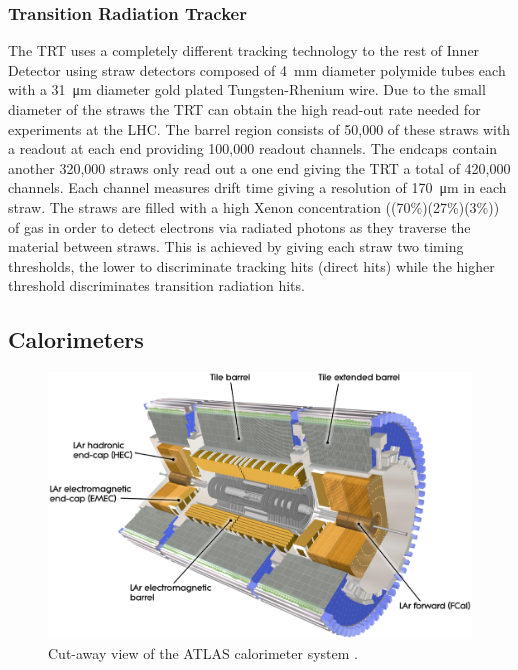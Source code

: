 		\subsubsection*{Transition Radiation Tracker}

		The TRT uses a completely different tracking technology to the rest of Inner Detector using straw detectors composed of 4~mm diameter polymide tubes each with a \SI{31}{\um} diameter gold plated Tungsten-Rhenium wire. Due to the small diameter of the straws the TRT can obtain the high read-out rate needed for experiments at the LHC. The barrel region consists of 50,000 of these straws with a readout at each end providing 100,000 readout channels. The endcaps contain another 320,000 straws only read out a one end giving the TRT a total of 420,000 channels. Each channel measures drift time giving a resolution of \SI{170}{\um} in each straw. The straws are filled with a high Xenon concentration ((70\%)(27\%)(3\%)) of gas in order to detect electrons via radiated photons as they traverse the material between straws. This is achieved by giving each straw two timing thresholds, the lower to discriminate tracking hits (direct hits) while the higher threshold discriminates transition radiation hits. \\ %
		



	\subsection{Calorimeters}

		\begin{figure}[h]
			\begin{center}
				\includegraphics[scale=0.35]{images/Calorimeter_d3.eps}
			\end{center}
			\caption{Cut-away view of the ATLAS calorimeter system \cite{Aad:1129811}.}
			\label{fig:ATLAS_calo}
		\end{figure}

